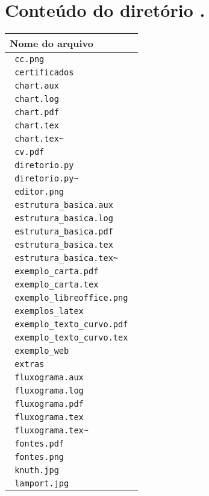 \documentclass{article}
\begin{document}
\section*{Conteúdo do diretório  . }
\begin{center}
\begin{longtable}{|l|}\hline
\hline Nome do arquivo \\ \hline \endfirsthead
\verb+ cc.png +\\ 
\verb+ certificados +\\ 
\verb+ chart.aux +\\ 
\verb+ chart.log +\\ 
\verb+ chart.pdf +\\ 
\verb+ chart.tex +\\ 
\verb+ chart.tex~ +\\ 
\verb+ cv.pdf +\\ 
\verb+ diretorio.py +\\ 
\verb+ diretorio.py~ +\\ 
\verb+ editor.png +\\ 
\verb+ estrutura_basica.aux +\\ 
\verb+ estrutura_basica.log +\\ 
\verb+ estrutura_basica.pdf +\\ 
\verb+ estrutura_basica.tex +\\ 
\verb+ estrutura_basica.tex~ +\\ 
\verb+ exemplo_carta.pdf +\\ 
\verb+ exemplo_carta.tex +\\ 
\verb+ exemplo_libreoffice.png +\\ 
\verb+ exemplos_latex +\\ 
\verb+ exemplo_texto_curvo.pdf +\\ 
\verb+ exemplo_texto_curvo.tex +\\ 
\verb+ exemplo_web +\\ 
\verb+ extras +\\ 
\verb+ fluxograma.aux +\\ 
\verb+ fluxograma.log +\\ 
\verb+ fluxograma.pdf +\\ 
\verb+ fluxograma.tex +\\ 
\verb+ fluxograma.tex~ +\\ 
\verb+ fontes.pdf +\\ 
\verb+ fontes.png +\\ 
\verb+ knuth.jpg +\\ 
\verb+ lamport.jpg +\\ 

\end{longtable}
\end{center}
\end{document}
